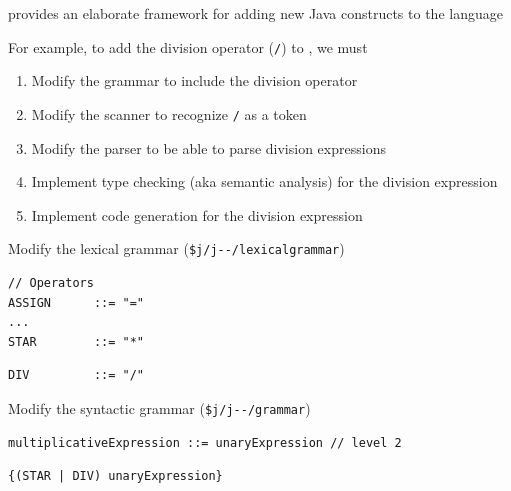 \documentclass[8pt,a4paper,compress]{beamer}
\begin{document}
\begin{frame}[fragile]
\pause

\jmm provides an elaborate framework for adding new Java constructs to the \jmm language

\pause\bigskip

For example, to add the division operator (\lstinline{/}) to \jmm, we must
\begin{enumerate}
\pause
\item Modify the \jmm grammar to include the division operator

\pause
\item Modify the scanner to recognize \lstinline{/} as a token

\pause
\item Modify the parser to be able to parse division expressions

\pause
\item Implement type checking (aka semantic analysis) for the division expression

\pause
\item Implement code generation for the division expression
\end{enumerate}

\pause\bigskip

Modify the lexical grammar (\lstinline{$j/j--/lexicalgrammar})

\begin{tcolorbox}[enhanced,drop shadow southwest,sharp corners,size=fbox,colback=white,fontlower=\small\ttfamily,collower=silver900]

\begin{lstlisting}[language={},style=focusin]
// Operators
ASSIGN      ::= "="
...
STAR        ::= "*"
\end{lstlisting}
\begin{lstlisting}[language={},style=focusin,backgroundcolor=\color{lime100}]
DIV         ::= "/"
\end{lstlisting}
\end{tcolorbox}

\pause\bigskip

Modify the syntactic grammar (\lstinline{$j/j--/grammar})

\begin{tcolorbox}[enhanced,drop shadow southwest,sharp corners,size=fbox,colback=white,fontlower=\small\ttfamily,collower=silver900]
\begin{lstlisting}[language={},style=focusin]
multiplicativeExpression ::= unaryExpression // level 2
\end{lstlisting}
\begin{lstlisting}[language={},style=focusin,backgroundcolor=\color{lime100}]
                               {(STAR | DIV) unaryExpression}
\end{lstlisting}
\end{tcolorbox}
\end{frame}
\end{document}
